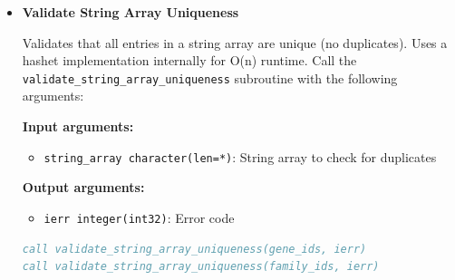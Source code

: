 \begin{enumerate}
\begin{itemize}
                  \textbf{Input arguments:}
                  \begin{itemize}
                    \item \texttt{gene\_to\_family integer(int32)}: Gene to family mapping
                          array
                          
                    \item \texttt{n\_families integer(int32)}: Number of valid families
                  \end{itemize}
                  \textbf{Output arguments:}
                  \begin{itemize}
                    \item \texttt{ierr integer(int32)}: Error code
                  \end{itemize}
                  \begin{lstlisting}[language=Fortran, caption={Validate Gene-Family Mapping}]
call validate_gene_to_family_mapping(gene_to_fam, n_families, ierr)
                  \end{lstlisting}
                  
            \item \textbf{Validate String Array Uniqueness}
                  
                  Validates that all entries in a string array are unique (no duplicates).
                  Uses a hashet implementation internally for O(n) runtime. Call the
                  \texttt{validate\_string\_array\_uniqueness} subroutine with the following
                  arguments:
                  
                  \textbf{Input arguments:}
                  \begin{itemize}
                    \item \texttt{string\_array character(len=*)}: String array to check
                          for duplicates
                  \end{itemize}
                  \textbf{Output arguments:}
                  \begin{itemize}
                    \item \texttt{ierr integer(int32)}: Error code
                  \end{itemize}
                  \begin{lstlisting}[language=Fortran, caption={Validate Unique Strings}]
call validate_string_array_uniqueness(gene_ids, ierr)
call validate_string_array_uniqueness(family_ids, ierr)
                  \end{lstlisting}
          \end{itemize}
          

\end{enumerate}
